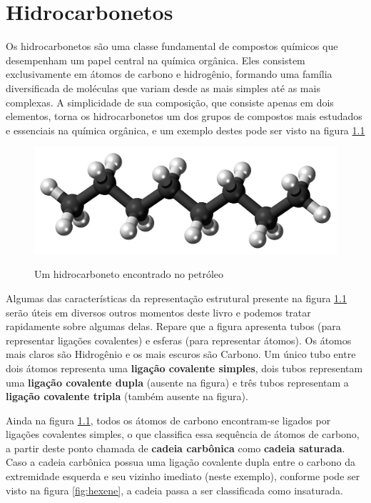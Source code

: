 \chapter{Hidrocarbonetos}
\begin{mdframed}[backgroundcolor=orange!20,linewidth=0pt,roundcorner=10pt]
	\minitoc
\end{mdframed}
Os hidrocarbonetos são uma classe fundamental de compostos químicos que desempenham um papel central na química orgânica. Eles consistem exclusivamente em átomos de carbono e hidrogênio, formando uma família diversificada de moléculas que variam desde as mais simples até as mais complexas. A simplicidade de sua composição, que consiste apenas em dois elementos, torna os hidrocarbonetos um dos grupos de compostos mais estudados e essenciais na química orgânica, e um exemplo destes pode ser visto na figura \ref{fig:ocatene}

\begin{figure}[h]\centering
\caption{Um hidrocarboneto encontrado no petróleo}
\includegraphics[scale=0.175]{imagens/Octane_3D_ball.png}
\label{fig:ocatene}\vspace{0.5cm}\end{figure}

Algumas das características da representação estrutural presente na figura \ref{fig:ocatene} serão úteis em diversos outros momentos deste livro e podemos tratar rapidamente sobre algumas delas. Repare que a figura apresenta tubos (para representar ligações covalentes) e esferas (para representar átomos). Os átomos mais claros são Hidrogênio e os mais escuros são Carbono. Um único tubo entre dois átomos representa uma \textbf{ligação covalente simples}, dois tubos representam uma \textbf{ligação covalente dupla} (ausente na figura) e três tubos representam a \textbf{ligação covalente tripla} (também ausente na figura).

Ainda na figura \ref{fig:ocatene}, todos os átomos de carbono encontram-se ligados por ligações covalentes simples, o que classifica essa sequência de átomos de carbono, a partir deste ponto chamada de \textbf{cadeia carbônica} como \textbf{cadeia saturada}. Caso a cadeia carbônica possua uma ligação covalente dupla entre o carbono da extremidade esquerda e seu vizinho imediato (neste exemplo), conforme pode ser visto na figura \ref{fig:hexene}, a cadeia passa a ser classificada como insaturada.

